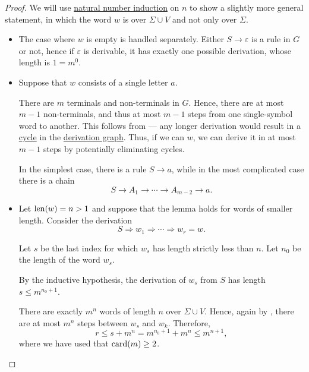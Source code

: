 \begin{proof}
  We will use \hyperref[rem:induction/peano_arithmetic]{natural number induction} on \( n \) to show a slightly more general statement, in which the word \( w \) is over \( \Sigma \cup V \) and not only over \( \Sigma \).

  \begin{itemize}
    \item The case where \( w \) is empty is handled separately. Either \( S \to \varepsilon \) is a rule in \( G \) or not, hence if \( \varepsilon \) is derivable, it has exactly one possible derivation, whose length is \( 1 = m^0 \).

    \item Suppose that \( w \) consists of a single letter \( a \).

    There are \( m \) terminals and non-terminals in \( G \). Hence, there are at most \( m - 1 \) non-terminals, and thus at most \( m - 1 \) steps from one single-symbol word to another. This follows from  --- any longer derivation would result in a \hyperref[def:quiver_path/cycle]{cycle} in the \hyperref[def:formal_grammar/graph]{derivation graph}. Thus, if we can \( w \), we can derive it in at most \( m - 1 \) steps by potentially eliminating cycles.

    In the simplest case, there is a rule \( S \to a \), while in the most complicated case there is a chain
    \begin{equation*}
      S \to A_1 \to \cdots \to A_{m-2} \to a.
    \end{equation*}

    \item Let \( \operatorname{len}(w) = n > 1 \) and suppose that the lemma holds for words of smaller length. Consider the derivation
    \begin{equation*}
      S \Rightarrow w_1 \Rightarrow \cdots \Rightarrow w_r = w.
    \end{equation*}

    Let \( s \) be the last index for which \( w_s \) has length strictly less than \( n \). Let \( n_0 \) be the length of the word \( w_s \).

    By the inductive hypothesis, the derivation of \( w_s \) from \( S \) has length \( s \leq m^{n_0 + 1} \).

    There are exactly \( m^n \) words of length \( n \) over \( \Sigma \cup V \). Hence, again by , there are at most \( m^n \) steps between \( w_s \) and \( w_k \). Therefore,
    \begin{equation*}
      r
      \leq
      s + m^n
      =
      m^{n_0 + 1} + m^n
      \leq
      m^{n+1},
    \end{equation*}
    where we have used that \( \operatorname{card}(m) \geq 2 \).
  \end{itemize}
\end{proof}

